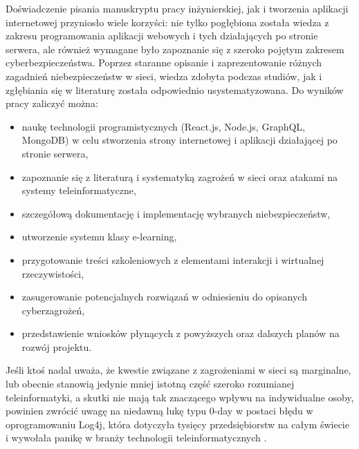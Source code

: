 \documentclass[12pt,twoside]{article}
\begin{document}
Doświadczenie pisania manuskryptu pracy inżynierskiej, jak i tworzenia aplikacji internetowej przyniosło wiele korzyści: nie tylko pogłębiona została wiedza z zakresu programowania aplikacji webowych i tych działających po stronie serwera, ale również wymagane było zapoznanie się z szeroko pojętym zakresem cyberbezpieczeństwa. Poprzez staranne opisanie i zaprezentowanie różnych zagadnień niebezpieczeństw w sieci, wiedza zdobyta podczas studiów, jak i zgłębiania się w literaturę została odpowiednio usystematyzowana. Do wyników pracy zaliczyć można:
\begin{itemize}

\item naukę technologii programistycznych (React.js, Node.js, GraphQL, MongoDB) w celu stworzenia strony internetowej i aplikacji działającej po stronie serwera,
\item zapoznanie się z literaturą i systematyką zagrożeń w sieci oraz atakami na systemy teleinformatyczne,
\item szczegółową dokumentację i implementację wybranych niebezpieczeństw,
\item utworzenie systemu klasy e-learning,
\item przygotowanie treści szkoleniowych z elementami interakcji i wirtualnej rzeczywistości,
\item zasugerowanie potencjalnych rozwiązań w odniesieniu do opisanych cyberzagrożeń,
\item przedstawienie wniosków płynących z powyższych oraz dalszych planów na rozwój projektu.\\

\end{itemize}
Jeśli ktoś nadal uważa, że kwestie związane z zagrożeniami w sieci są marginalne, lub obecnie stanowią jedynie mniej istotną część szeroko rozumianej teleinformatyki, a skutki nie mają tak znaczącego wpływu na indywidualne osoby, powinien zwrócić uwagę na niedawną lukę typu 0-day w postaci błędu w oprogramowaniu Log4j, która dotyczyła tysięcy przedsiębiorstw na całym świecie i wywołała panikę w branży technologii teleinformatycznych \cite{Log4j}.

\clearpage

\end{document}
